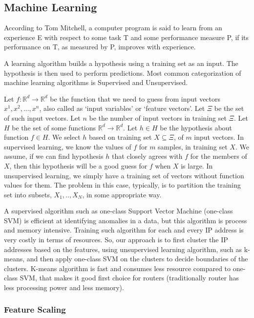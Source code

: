 \documentclass[12pt,oneside,a4paper]{article}
\begin{document}
\subsection{Machine Learning}

According to Tom Mitchell\cite{machine-learning-def}, a computer program is said to learn from an experience E with respect to some task T and some performance measure P, if its performance on T, as measured by P, improves with experience.

A learning algorithm builds a hypothesis using a training set as an input. The hypothesis is then used to perform predictions. Most common categorization of machine learning algorithms is Supervised and Unsupervised.

Let $f: \mathbb{R}^d \rightarrow \mathbb{R}^d$ be the function that we need to guess from input vectors $x^{1}, x^{2}, ..., x^{n}$, also called as `input variables' or `feature vectors'. Let $\Xi$ be the set of such input vectors. Let $n$ be the number of input vectors in training set $\Xi$. Let $H$ be the set of some functions $\mathbb{R}^d \rightarrow \mathbb{R}^d$. Let $h \in H$ be the hypothesis about function $f \in H$. We select $h$ based on training set $X \subseteq \Xi$, of $m$ input vectors. In supervised learning, we know the values of $f$ for $m$ samples, in training set $X$. We assume, if we can find hypothesis $h$ that closely agrees with $f$ for the members of $X$, then this hypothesis will be a good guess for $f$ when $X$ is large. In unsupervised learning, we simply have a training set of vectors without function values for them. The problem in this case, typically, is to partition the training set into subsets, $X_1,.. ,X_{N}$, in some appropriate way.\cite{machine-learning}

A supervised algorithm such as one-class Support Vector Machine (one-class SVM)\cite{svm} is efficient at identifying anomalies in a data, but this algorithm is process and memory intensive. Training such algorithm for each and every IP address is very costly in terms of resources. So, our approach is to first cluster the IP addresses based on the features, using unsupervised learning algorithm, such as k-means, and then apply one-class SVM on the clusters to decide boundaries of the clusters. K-means algorithm is fast and consumes less resource compared to one-class SVM, that makes it good first choice for routers (traditionally router has less processing power and less memory).

\subsubsection{Feature Scaling}
\end{document}
